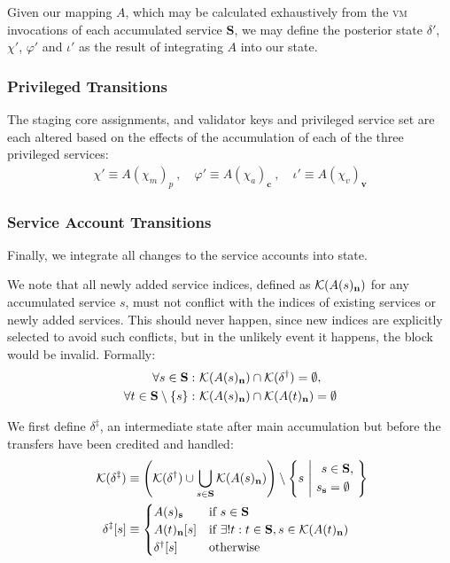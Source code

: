 Given our mapping $A$, which may be calculated exhaustively from the \textsc{vm} invocations of each accumulated service $\mathbf{S}$, we may define the posterior state $\delta'$, $\chi'$, $\varphi'$ and $\iota'$ as the result of integrating $A$ into our state.

\subsubsection{Privileged Transitions}
The staging core assignments, and validator keys and privileged service set are each altered based on the effects of the accumulation of each of the three privileged services:
\begin{align}
  \chi' \equiv A(\chi_m)_p \ ,\quad
  \varphi' \equiv A(\chi_a)_\mathbf{c} \ ,\quad
  \iota' \equiv A(\chi_v)_\mathbf{v}
\end{align}

\subsubsection{Service Account Transitions}
Finally, we integrate all changes to the service accounts into state.

We note that all newly added service indices, defined as $\mathcal{K}(A(s)_\mathbf{n})$ for any accumulated service $s$, must not conflict with the indices of existing services or newly added services. This should never happen, since new indices are explicitly selected to avoid such conflicts, but in the unlikely event it happens, the block would be invalid. Formally:
\begin{equation}
  \begin{aligned}
  \forall s \in \mathbf{S} :\ &\keys{A(s)_\mathbf{n}} \cap \keys{\delta^\dagger} = \none, \\
  \forall t \in \mathbf{S} \setminus \{s\} :\ &\keys{A(s)_\mathbf{n}} \cap \keys{A(t)_\mathbf{n}} = \none
\end{aligned}
\end{equation}

We first define $\delta^\ddagger$, an intermediate state after main accumulation but before the transfers have been credited and handled:
\begin{equation}\begin{aligned}
  \keys{\delta^\ddagger} &\equiv \left ( \keys{\delta^\dagger} \cup \bigcup_{s \in \mathbf{S}} \keys{A(s)_\mathbf{n}} \right ) \setminus \left\{s\ \middle\vert\ \begin{aligned}s &\in \mathbf{S},\\s_\mathbf{s} &= \none\end{aligned}\ \right\}\!\!\\
  \delta^\ddagger[s] &\equiv \begin{cases}
    A(s)_\mathbf{s} &\when s \in \mathbf{S}\\
    A(t)_\mathbf{n}[s] &\when \exists! t : t \in \mathbf{S}, s \in \keys{A(t)_\mathbf{n}} \\
    \delta^\dagger[s] &\otherwise
  \end{cases}
\end{aligned}\end{equation}

